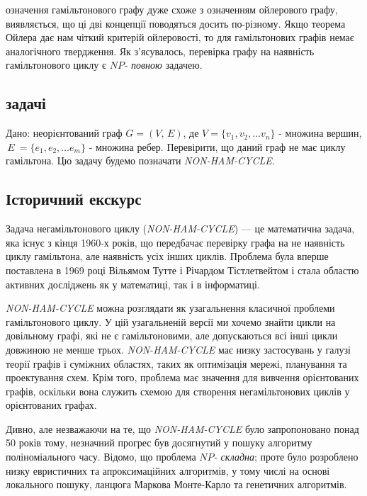 \documentclass[14pt]{article}
\begin{document}
\begin{spacing}{1.175}
         означення гамільтонового графу дуже схоже з означенням ойлерового графу, виявляється, що ці дві концепції поводяться досить по-різному. Якщо теорема Ойлера дає нам чіткий критерій ойлеровості, то для гамільтонових графів немає аналогічного твердження. Як з'ясувалось, перевірка графу на наявність гамільтонового циклу є \(NP\)\textit{- повною} задачею.

        \newcommand{\nonhamcycle}{\textit{NON-HAM-CYCLE}}
        \newcommand{\hamcycle}{\textit{HAM-CYCLE}}
        \newcommand{\dhampath}{\textit{D-HAM-PATH}}
        \newcommand{\tsat}{\textit{3SAT}}
        \newcommand{\bolddot}{\textbf{.}}

        
        \subsection{ задачі}
        \quad Дано: неорієнтований граф \(G = (V,\,E)\), де \(V = \{v_1, v_2, \dots v_n\}\) - множина вершин, \(\,E\ = \{e_1, e_2, \dots e_m\}\) - множина ребер. Перевірити, що даний граф не має циклу гамільтона. Цю задачу будемо позначати \nonhamcycle .    
        \subsection{\normalfont Історичний екскурс}
        
        Задача негамільтонового циклу (\nonhamcycle) — це математична задача, яка існує з кінця 1960-х років, що передбачає перевірку графа на не наявність циклу гамільтона, але наявність усіх інших циклів. Проблема була вперше поставлена в 1969 році Вільямом Тутте і Річардом Тістлетвейтом і стала областю активних досліджень як у математиці, так і в інформатиці.

        \nonhamcycle\hspace{0.05cm} можна розглядати як узагальнення класичної проблеми гамільтонового циклу. У цій узагальненій версії ми хочемо знайти цикли на довільному графі, які не є гамільтоновими, але допускаються всі інші цикли довжиною не менше трьох. \nonhamcycle\hspace{0.05cm} має низку застосувань у галузі теорії графів і суміжних областях, таких як оптимізація мережі, планування та проектування схем. Крім того, проблема має значення для вивчення орієнтованих графів, оскільки вона служить схемою для створення негамільтонових циклів у орієнтованих графах.

        Дивно, але незважаючи на те, що \hspace{0.05cm}\nonhamcycle\hspace{0.05cm} було запропоновано понад 50 років тому, незначний прогрес був досягнутий у пошуку алгоритму поліноміального часу. Відомо, що проблема \(NP\)\textit{- складна}; проте було розроблено низку евристичних та апроксимаційних алгоритмів, у тому числі на основі локального пошуку, ланцюга Маркова Монте-Карло та генетичних алгоритмів.


\end{spacing}
\end{document}
